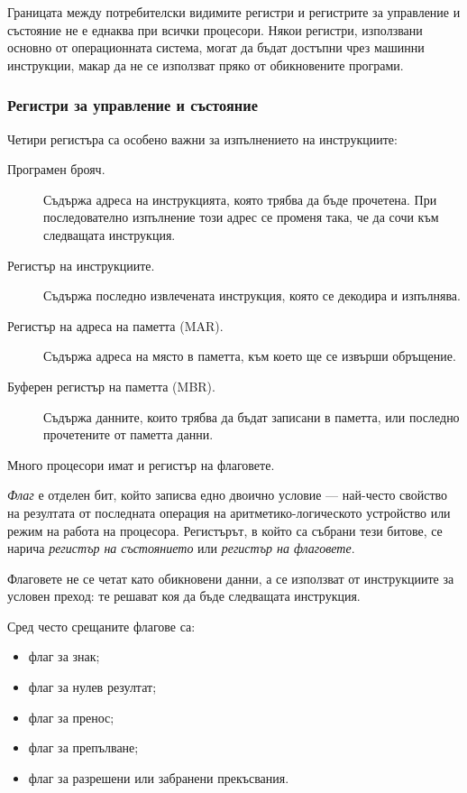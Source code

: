 Границата между потребителски видимите регистри и регистрите за управление и състояние не е еднаква при всички процесори. Някои регистри, използвани основно от операционната система, могат да бъдат достъпни чрез машинни инструкции, макар да не се използват пряко от обикновените програми.

\subsubsection{Регистри за управление и състояние}

Четири регистъра са особено важни за изпълнението на инструкциите:

\begin{description}
    \item[Програмен брояч.] Съдържа адреса на инструкцията, която трябва да бъде прочетена. При последователно изпълнение този адрес се променя така, че да сочи към следващата инструкция.
    \item[Регистър на инструкциите.] Съдържа последно извлечената инструкция, която се декодира и изпълнява.
    \item[Регистър на адреса на паметта (MAR).] Съдържа адреса на място в паметта, към което ще се извърши обръщение.
    \item[Буферен регистър на паметта (MBR).] Съдържа данните, които трябва да бъдат записани в паметта, или последно прочетените от паметта данни.
\end{description}

Много процесори имат и регистър на флаговете.

\begin{defn}
\emph{Флаг} е отделен бит, който записва едно двоично условие --- най-често свойство на резултата от последната операция на аритметико-логическото устройство или режим на работа на процесора. Регистърът, в който са събрани тези битове, се нарича \emph{регистър на състоянието} или \emph{регистър на флаговете}.

Флаговете не се четат като обикновени данни, а се използват от инструкциите за условен преход: те решават коя да бъде следващата инструкция.
\end{defn}

Сред често срещаните флагове са:

\begin{itemize}
    \item флаг за знак;
    \item флаг за нулев резултат;
    \item флаг за пренос;
    \item флаг за препълване;
    \item флаг за разрешени или забранени прекъсвания.
\end{itemize}

